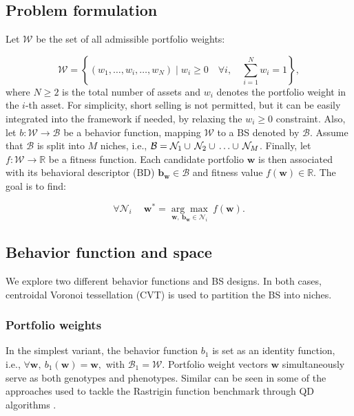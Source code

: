 \subsection{Problem formulation}
Let $\mathcal{W}$ be the set of all admissible portfolio weights:

\begin{equation}
    \mathcal{W} = \left\{ (w_1, \ldots, w_i, \ldots, w_N) \mid w_i \geq 0 \quad \forall i, \quad \sum_{i=1}^{N} w_i = 1 \right\},
\label{eq3}
\end{equation}
where $N \geq 2$ is the total number of assets and $w_i$ denotes the portfolio weight in the $i$-th asset. For simplicity, short selling is not permitted, but it can be easily integrated into the framework if needed, by relaxing the $w_i \geq 0$ constraint.
Also, let  $b : \mathcal{W} \rightarrow \mathcal{B}$ be a behavior function, mapping $\mathcal{W}$ to a BS denoted by $\mathcal{B}$. Assume that $\mathcal{B}$ is split into $M$ niches, i.e., $\mathcal{B} = \mathcal{N}_1 \cup \mkern3mu \mathcal{N}_2 \cup \mkern3mu \ldots \cup \mkern3mu \mathcal{N}_M$. Finally, let $f: \mathcal{W} \rightarrow \mathbb{R}$ be a fitness function. Each candidate portfolio $\boldsymbol{w}$ is then associated with its behavioral descriptor (BD) $\boldsymbol{b}_{\boldsymbol{w}} \in \mathcal{B}$ and fitness value $f(\boldsymbol{w}) \in \mathbb{R}$. The goal is to find: 

\begin{equation}
\forall \mathcal{N}_i \quad \ \boldsymbol{w}^*=\underset{\boldsymbol{w},\  \boldsymbol{b}_{\boldsymbol{w}} \in \mathcal{N}_i}{\arg \max } \ f(\boldsymbol{w}).
\end{equation}

\subsection{Behavior function and space}

We explore two different behavior functions and BS designs. In both cases, centroidal Voronoi tessellation (CVT) is used to partition the BS into niches. 
\subsubsection{Portfolio weights}In the simplest variant, the behavior function \(b_1\) is set as an identity function, i.e., \(\forall \boldsymbol{w}, \ b_1(\boldsymbol{w})=\boldsymbol{w},\) with \(\mathcal{B}_1 = \mathcal{W}.\) Portfolio weight vectors $\textbf{w}$ simultaneously serve as both genotypes and phenotypes. Similar can be seen in some of the approaches used to tackle the Rastrigin function benchmark \cite{digalakis} through QD algorithms \cite{bossens,sfikas}. 

